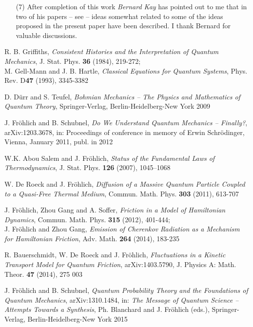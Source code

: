 \documentclass[a4paper,11pt]{article}
\begin{document}
\begin{enumerate}
\item[(7)]{After completion of this work \textit{Bernard Kay} has pointed out to me that in two of his papers -- see \cite{Kay} -- ideas somewhat related to some of the ideas proposed in the present paper have been described. I thank Bernard for valuable discussions.}

\end{enumerate}


\begin{thebibliography}{References}

R. B. Griffiths, \textit{Consistent Histories and the Interpretation of Quantum Mechanics}, J. Stat. Phys. {\bf{36}} (1984), 219-272;\\
M. Gell-Mann and J. B. Hartle, \textit{Classical Equations for Quantum Systems}, Phys. Rev. D{\bf{47}} (1993), 3345-3382 

 D. D\"{u}rr and S. Teufel, \textit{Bohmian Mechanics -- The Physics and Mathematics of Quantum Theory}, Springer-Verlag, Berlin-Heidelberg-New York 2009

J. Fr\"{o}hlich and B. Schubnel, \textit{Do We Understand Quantum Mechanics -- Finally?}, arXiv:1203.3678, in: Proceedings of conference in memory of Erwin Schr\"{o}dinger, Vienna, January 2011, publ. in 2012

 W.K. Abou Salem and J. Fr\"{o}hlich, \textit{Status of the Fundamental Laws of Thermodynamics}, J. Stat. Phys. {\bf{126}} (2007), 1045–1068

 W. De Roeck and J. Fr\"{o}hlich, \textit{Diffusion of a Massive Quantum Particle Coupled to a Quasi-Free Thermal Medium}, Commun. Math. Phys. {\bf{303}} (2011), 613-707

 J. Fr\"{o}hlich, Zhou Gang and A. Soffer, \textit{Friction in a Model of Hamiltonian Dynamics}, Commun. Math. Phys. {\bf{315}} (2012), 401-444;\\
J. Fr\"{o}hlich and Zhou Gang, \textit{Emission of Cherenkov Radiation as a Mechanism for Hamiltonian Friction}, Adv. Math. {\bf{264}} (2014), 183-235

 R. Bauerschmidt, W. De Roeck and J. Fr\"{o}hlich, \textit{Fluctuations in a Kinetic Transport Model for Quantum Friction}, arXiv:1403.5790, J. Physics A: Math. Theor. {\bf{47}} (2014), 275 003

 J. Fr\"{o}hlich and B. Schubnel, \textit{Quantum Probability Theory and the Foundations of Quantum Mechanics}, arXiv:1310.1484, in: \textit{The Message of Quantum Science -- Attempts Towards a Synthesis}, Ph. Blanchard and J. Fr\"{o}hlich (eds.), Springer-Verlag, Berlin-Heidelberg-New York 2015


\end{thebibliography}
\end{document}
